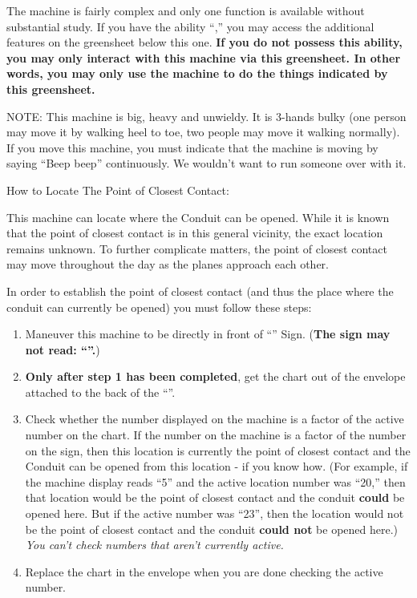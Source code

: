\documentclass[green]{elementals}
\begin{document}
\name{\gConduitCover{}}


The machine is fairly complex and only one function is available without substantial study. If you have the ability ``\aWorkConduit{},'' you may access the additional features on the greensheet below this one. {\bf If you do not possess this ability, you may only interact with this machine via this greensheet. In other words, you may only use the machine to do the things indicated by this greensheet.}

NOTE: This machine is big, heavy and unwieldy. It is 3-hands bulky (one person may move it by walking heel to toe, two people may move it walking normally). If you move this machine, you must indicate that the machine is moving by saying ``Beep beep'' continuously. We wouldn't want to run someone over with it.



{\large How to Locate The Point of Closest Contact:}


This machine can locate where the Conduit can be opened. While it is known that the point of closest contact is in this general vicinity, the exact location remains unknown. To further complicate matters, the point of closest contact may move throughout the day as the planes approach each other.

In order to establish the point of closest contact (and thus the place where the conduit can currently be opened) you must follow these steps:
\begin{enumerate}
  \item Maneuver this machine to be directly in front of ``\sLocationCoverSheet{}'' Sign. ({\bf The sign may not read: ``\sSealedLocationSheet{}''.})
  \item {\bf Only after step 1 has been completed}, get the chart out of the envelope attached to the back of the ``\sLocationCoverSheet{}''.
  \item Check whether the number displayed on the machine is a factor of the active number on the chart. If the number on the machine is a factor of the number on the sign, then this location is currently the point of closest contact and the Conduit can be opened from this location - if you know how. (For example, if the machine display reads ``5'' and the active location number was ``20,'' then that location would be the point of closest contact and the conduit {\bf could} be opened here. But if the active number was ``23'', then the location would not be the point of closest contact and the conduit {\bf could not} be opened here.) \emph{You can't check numbers that aren't currently active.} 
  \item Replace the chart in the envelope when you are done checking the active number.
\end{enumerate}
\end{document}
